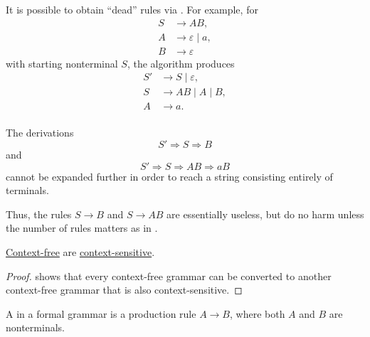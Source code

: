 \begin{example}
\begin{thmenum}
     It is possible to obtain \enquote{dead} rules via . For example, for
    \begin{equation*}
      \begin{aligned}
        S &\to A B, \\
        A &\to \varepsilon \mid a, \\
        B &\to \varepsilon
      \end{aligned}
    \end{equation*}
    with starting nonterminal \( S \), the algorithm produces
    \begin{equation*}
      \begin{aligned}
        S' &\to S \mid \varepsilon, \\
        S &\to A B \mid A \mid B, \\
        A &\to a. \\
      \end{aligned}
    \end{equation*}

    The derivations
    \begin{equation*}
      S' \Rightarrow S \Rightarrow B
    \end{equation*}
    and
    \begin{equation*}
      S' \Rightarrow S \Rightarrow A B \Rightarrow a B
    \end{equation*}
    cannot be expanded further in order to reach a string consisting entirely of terminals.

    Thus, the rules \( S \to B \) and \( S \to A B \) are essentially useless, but do no harm unless the number of rules matters as in .
  \end{thmenum}
\end{example}

\begin{proposition}\label{thm:context_free_languages_are_context_sensitive}
  \hyperref[def:chomsky_hierarchy/context_free]{Context-free}  are \hyperref[def:chomsky_hierarchy/context_sensitive]{context-sensitive}.
\end{proposition}
\begin{proof}
   shows that every context-free grammar can be converted to another context-free grammar that is also context-sensitive.
\end{proof}

\begin{definition}\label{def:renaming_rule}\mimprovised
  A  in a formal grammar is a production rule \( A \to B \), where both \( A \) and \( B \) are nonterminals.
\end{definition}

